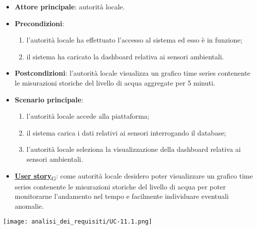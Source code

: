 \begin{itemize}
	\item \textbf{Attore principale}: autorità locale.
	\item \textbf{Precondizioni}:
	      \begin{enumerate}
		      \item l'autorità locale ha effettuato l'accesso al sistema ed esso è in funzione;
		      \item il sistema ha caricato la dashboard relativa ai sensori ambientali.
	      \end{enumerate}
	\item \textbf{Postcondizioni}: l'autorità locale visualizza un grafico time series contenente le misurazioni storiche
	      del livello di acqua aggregate per 5 minuti.
	\item \textbf{Scenario principale}:
	      \begin{enumerate}
		      \item l'autorità locale accede alla piattaforma;
		      \item il sistema carica i dati relativi ai sensori interrogando il database;
		      \item l'autorità locale seleziona la visualizzazione della dashboard relativa ai sensori ambientali.
	      \end{enumerate}
	\item \href{https://7last.github.io/docs/pb/documentazione-interna/glossario\#user-story}{\textbf{User story}\textsubscript{G}}:
	      come autorità locale desidero poter visualizzare un grafico time series contenente le misurazioni storiche
	      del livello di acqua per poter monitorarne l'andamento nel tempo e facilmente individuare eventuali anomalie.
\end{itemize}
\begin{center}
	\texttt{[image: analisi\_dei\_requisiti/UC-11.1.png]}
\end{center}


